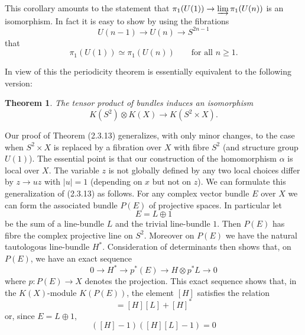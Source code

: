 \documentclass[leqno]{book}
\numberwithin{equation}{section}
\newtheorem{theorem}{Theorem}[section]%
\theoremstyle{definition}
\begin{document}
            This corollary amounts to the statement that $\pi_1(U(1))\to \varinjlim \pi_1(U(n))$ is an isomorphism. In fact it is easy to show by using the fibrations
            \begin{equation*}
              U(n-1)\to U(n)\to S^{2n-1}
            \end{equation*}
            that
            \begin{equation*}
              \pi_1(U(1))\simeq \pi_1(U(n))\qquad \text{for all } n\ge 1.
            \end{equation*}

            In view of this the periodicity theorem is essentially equivalent to the following version:

            \begin{theorem}
              The tensor product of bundles induces an isomorphism 
              \begin{equation*}
                K(S^{2})\otimes K(X)\to K(S^{2}\times X).
              \end{equation*}
            \end{theorem}

            Our proof of Theorem (2.3.13) generalizes, with only minor changes, to the case when $S^{2}\times X$ is replaced by a fibration over $X$ with fibre $S^{2}$ (and structure group $U(1)$). The essential point is that our construction of the homomorphism $\alpha$ is local over $X$. The variable $z$ is not globally defined by any two local choices differ by $z\to uz$ with $|u|=1$ (depending on $x$ but not on $z$). We can formulate this generalization of (2.3.13) as follows. For any complex vector bundle $E$ over $X$ we can form the associated bundle $P(E)$ of projective spaces. In particular let
            \begin{equation*}
              E=L\oplus 1
            \end{equation*}
            be the sum of a line-bundle $L$ and the trivial line-bundle $1$. Then $P(E)$ has fibre the complex projective line on $S^{2}$. Moreover on $P(E)$ we have the natural tautologous line-bundle $H^{*}$. Consideration of determinants then shows that, on $P(E)$, we have an exact sequence
            \begin{equation*}
              0\to H^{*}\to p^{*}(E)\to H \otimes p^{*}L\to 0
            \end{equation*}
            where $p:P(E)\to X$ denotes the projection. This exact sequence shows that, in the $K(X)$-module $K(P(E))$, the element $[H]$ satisfies the relation
            \begin{equation*}
              [E]=[H][L]+[H]^{*}
            \end{equation*}
            or, since $E=L\oplus 1$,
            \begin{equation*}
              ([H]-1)([H][L]-1)=0
            \end{equation*}
\end{document}
